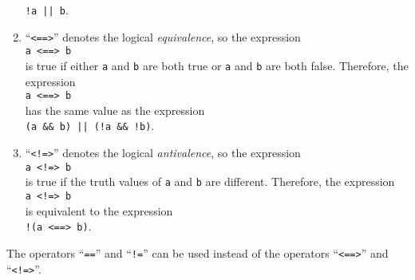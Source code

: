 \begin{enumerate}
      \hspace*{1.3cm}
      \texttt{!a || b}.
\item ``\texttt{<==>}'' denotes the logical \emph{equivalence},
      so the expression
      \\[0.2cm]
      \hspace*{1.3cm}
      \texttt{a <==> b}
      \\[0.2cm]
      is true if either  \texttt{a} and \texttt{b} are both true or \texttt{a} and
      \texttt{b} are both false. Therefore,  the expression 
      \\[0.2cm]
      \hspace*{1.3cm}
      \texttt{a <==> b}
      \\[0.2cm]
      has the same value as the expression
      \\[0.2cm]
      \hspace*{1.3cm}
      \texttt{(a \&\& b) || (!a \&\& !b)}.
\item ``\texttt{<!=>}'' denotes the logical \emph{antivalence},
      so the expression
      \\[0.2cm]
      \hspace*{1.3cm}
      \texttt{a <!=> b}
      \\[0.2cm]
      is true if the truth values of \texttt{a} and \texttt{b} are different.
      Therefore,  the expression 
      \\[0.2cm]
      \hspace*{1.3cm}
      \texttt{a <!=> b}
      \\[0.2cm]
      is equivalent to the expression
      \\[0.2cm]
      \hspace*{1.3cm}
      \texttt{!(a <==> b)}.
\end{enumerate}
The operators ``\texttt{==}'' and ``\texttt{!=}'' can be used instead of the operators
``\texttt{<==>}'' and ``\texttt{<!=>}''. 

